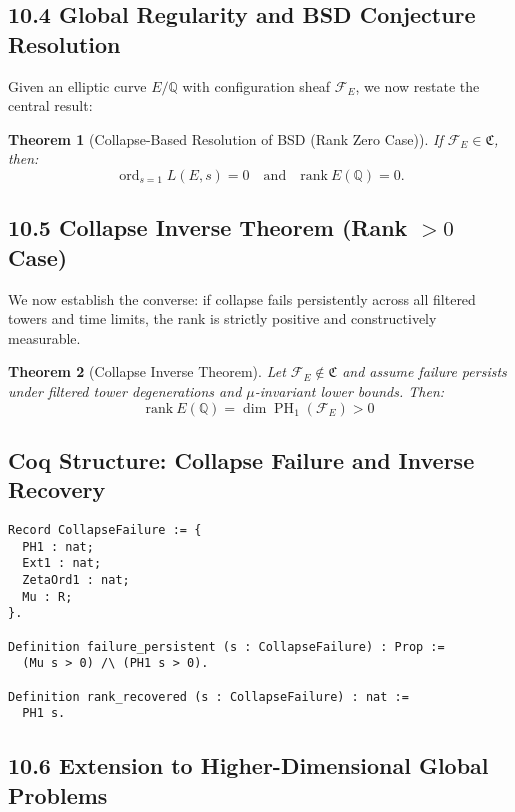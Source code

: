 \documentclass[11pt]{article}
\newtheorem{theorem}{Theorem}[section]
\DeclareMathOperator{\PH}{PH}
\newcommand{\ord}{\operatorname{ord}}
\begin{document}
\subsection*{10.4 Global Regularity and BSD Conjecture Resolution}

Given an elliptic curve \( E/\mathbb{Q} \) with configuration sheaf \( \mathcal{F}_E \), we now restate the central result:

\begin{theorem}[Collapse-Based Resolution of BSD (Rank Zero Case)]
\label{thm:bsd-collapse}
If \( \mathcal{F}_E \in \mathfrak{C} \), then:
\[
\ord_{s=1} L(E, s) = 0 \quad \text{and} \quad \mathrm{rank}~E(\mathbb{Q}) = 0.
\]
\end{theorem}

\subsection*{10.5 Collapse Inverse Theorem (Rank \texorpdfstring{$>0$}{>0} Case)}

We now establish the converse: if collapse fails persistently across all filtered towers and time limits, the rank is strictly positive and constructively measurable.

\begin{theorem}[Collapse Inverse Theorem]
\label{thm:collapse-inverse}
Let \( \mathcal{F}_E \notin \mathfrak{C} \) and assume failure persists under filtered tower degenerations and \(\mu\)-invariant lower bounds. Then:
\[
\mathrm{rank}~E(\mathbb{Q}) = \dim \PH_1(\mathcal{F}_E) > 0
\]
\end{theorem}

\subsection*{Coq Structure: Collapse Failure and Inverse Recovery}
\begin{lstlisting}[language=Coq]
Record CollapseFailure := {
  PH1 : nat;
  Ext1 : nat;
  ZetaOrd1 : nat;
  Mu : R;
}.

Definition failure_persistent (s : CollapseFailure) : Prop :=
  (Mu s > 0) /\ (PH1 s > 0).

Definition rank_recovered (s : CollapseFailure) : nat :=
  PH1 s.
\end{lstlisting}

\subsection*{10.6 Extension to Higher-Dimensional Global Problems}
\end{document}
